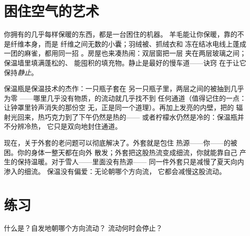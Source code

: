 \section{困住空气的艺术}

\begin{example}[冬季工程]\label{ex:g5:heat-and-insulation:air}
你拥有的几乎每样保暖的东西，都是一台困住的机器。
羊毛能让你保暖，靠的不是纤维本身，而是
纤维之间无数的小囊；羽绒被、抓绒衣和
冻在结冰电线上蓬成一团的麻雀，都用同一招
。房屋也来凑热闹：双层窗把一层
夹在两层玻璃之间；保温墙里填满蓬松的、
能囤积的填充物。静止是最好的慢车道——诀窍
在于让它保持\emph{静止}。
\end{example}

\begin{example}[保温瓶]\label{ex:g5:heat-and-insulation:thermos}
保温瓶是保温技术的杰作：一只瓶子套在
另一只瓶子里，两层之间的被抽到几乎为零
——哪里几乎没有物质，的流动就几乎找不到
任何通道（值得记住的一点：让钟罩里铃声消失的那份空
无，正是同一个道理）。再加上发亮的内壁，把的
辐射光回来，热巧克力到了下午仍然是热的——
或者柠檬水仍然是冷的：保温瓶并不分辨冷热，
它只是双向地封住通道。
\end{example}

\begin{remark}[保暖的正确说法]\label{rem:g5:heat-and-insulation:coat}
现在，关于外套的老问题可以彻底解决了。外套就是包住
热源——你——的被困。你的身体一整天都在向外
散发；外套把这股热流变成细流，你就能靠自己
产生的保持温暖。对于雪人——里面没有热源——
同一件外套只是减慢了夏天向内渗入的细流。
保温没有偏爱：无论朝哪个方向流，
它都会减慢这股流动。
\end{remark}

\section{练习}

\begin{exercise}[$\star$]\label{exo:g5:heat-and-insulation:1}
什么是？自发地朝哪个方向流动？
流动何时会停止？
\end{exercise}

